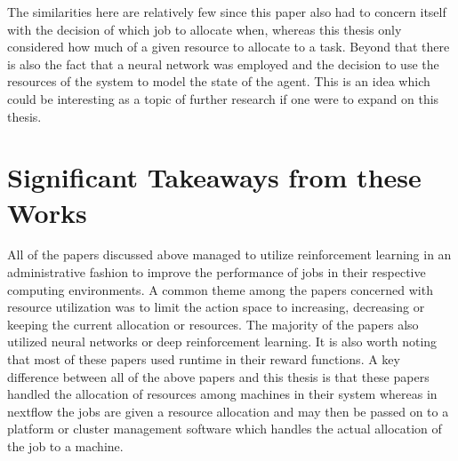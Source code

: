 The similarities here are relatively few since this paper also had to concern itself with the decision of which job to allocate when, whereas this thesis only considered how much of a given resource to allocate to a task. Beyond that there is also the fact that a neural network was employed and the decision to use the resources of the system to model the state of the agent. This is an idea which could be interesting as a topic of further research if one were to expand on this thesis.

\section{Significant Takeaways from these Works}
\label{sec:takeaways}

All of the papers discussed above managed to utilize reinforcement learning in an administrative fashion to improve the performance of jobs in their respective computing environments. A common theme among the papers concerned with resource utilization was to limit the action space to increasing, decreasing or keeping the current allocation or resources. The majority of the papers also utilized neural networks or deep reinforcement learning. It is also worth noting that most of these papers used runtime in their reward functions. A key difference between all of the above papers and this thesis is that these papers handled the allocation of resources among machines in their system whereas in nextflow the jobs are given a resource allocation and may then be passed on to a platform or cluster management software which handles the actual allocation of the job to a machine. 
















































 

